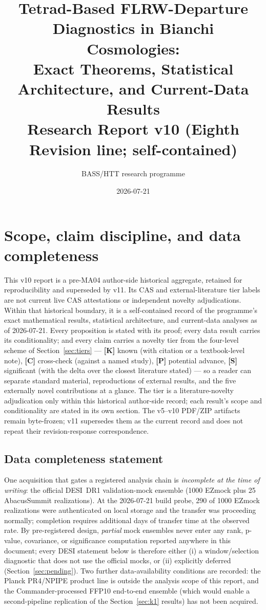 \documentclass[10pt]{article}
\title{Tetrad-Based FLRW-Departure Diagnostics in Bianchi Cosmologies:\\
Exact Theorems, Statistical Architecture, and Current-Data Results\\
{\large Research Report v10 (Eighth Revision line; self-contained)}}
\author{BASS/HTT research programme}
\date{2026-07-21}
\theoremstyle{definition}
\newcommand{\tier}[1]{\textbf{[#1]}}
\begin{document}
\maketitle
\tableofcontents
\clearpage

\section{Scope, claim discipline, and data completeness}

This v10 report is a pre-MA04 author-side historical aggregate, retained for
reproducibility and superseded by v11. Its CAS and external-literature tier
labels are not current live CAS attestations or independent novelty
adjudications. Within that historical boundary, it is a self-contained record
of the programme's exact mathematical results, statistical architecture, and
current-data analyses as of 2026-07-21. Every proposition is stated with its proof;
every data result carries its conditionality; and every claim carries a
novelty tier from the four-level scheme of
Section~\ref{sec:tiers} --- \tier{K} known (with citation or a
textbook-level note), \tier{C} cross-check (against a named study),
\tier{P} potential advance, \tier{S} significant (with the delta over
the closest literature stated) --- so a reader can separate standard
material, reproductions of external results, and the five externally
novel contributions at a glance. The tier is a literature-novelty
adjudication only within this historical author-side record; each result's
scope and conditionality are stated in its own section. The v5--v10 PDF/ZIP
artifacts remain byte-frozen; v11 supersedes them as the current record and
does not repeat their revision-response correspondence.

\subsection{Data completeness statement}
\label{sec:completeness}

One acquisition that gates a registered analysis chain is
\emph{incomplete at the time of writing}: the official DESI~DR1
validation-mock ensemble (1000 EZmock plus 25
AbacusSummit realizations). At the 2026-07-21 build probe,
290 of 1000 EZmock realizations were
authenticated on local storage and the transfer was proceeding
normally; completion requires additional days of transfer time at the
observed rate. By pre-registered design, \emph{partial} mock ensembles
never enter any rank, p-value, covariance, or significance computation
reported anywhere in this document; every DESI statement below is
therefore either (i) a window/selection diagnostic that does not use
the official mocks, or (ii) explicitly deferred
(Section~\ref{sec:pending}). Two further data-availability conditions
are recorded: the Planck PR4/NPIPE product line is outside the analysis
scope of this report, and the Commander-processed FFP10 end-to-end
ensemble (which would enable a second-pipeline replication of the
Section~\ref{sec:k1} results) has not been acquired.
\end{document}
